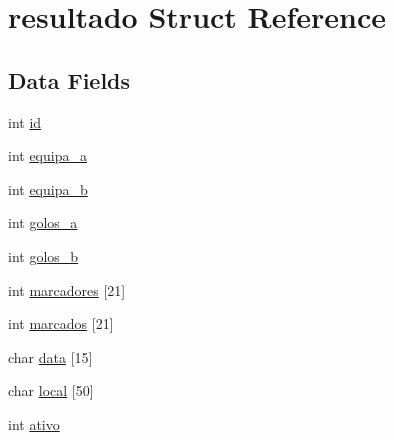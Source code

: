 \hypertarget{structresultado}{\section{resultado \-Struct \-Reference}
\label{structresultado}
}
\subsection*{\-Data \-Fields}
\begin{DoxyCompactItemize}
\item 
int \hyperlink{structresultado_a7441ef0865bcb3db9b8064dd7375c1ea}{id}
\item 
int \hyperlink{structresultado_ace35f821369216c24a34e4fba3edb969}{equipa\-\_\-a}
\item 
int \hyperlink{structresultado_aa9b8d46539767a87ab56c46e6444c9d6}{equipa\-\_\-b}
\item 
int \hyperlink{structresultado_a4300e439183b959a6dc34ce8dd37cea5}{golos\-\_\-a}
\item 
int \hyperlink{structresultado_a81df81d30e7a4500b5aede428858019b}{golos\-\_\-b}
\item 
int \hyperlink{structresultado_aa291c72d9a8809f53432613048a6fdfb}{marcadores} \mbox{[}21\mbox{]}
\item 
int \hyperlink{structresultado_a4e7b44437e808dd2fd5e173d52e71002}{marcados} \mbox{[}21\mbox{]}
\item 
char \hyperlink{structresultado_acce83e0644113db018f05aca84f07da3}{data} \mbox{[}15\mbox{]}
\item 
char \hyperlink{structresultado_ad0fbc2e59205ea604d8a9bac33ed9473}{local} \mbox{[}50\mbox{]}
\item 
int \hyperlink{structresultado_a5bc3bc4334890083c1af35103dae7964}{ativo}
\end{DoxyCompactItemize}


